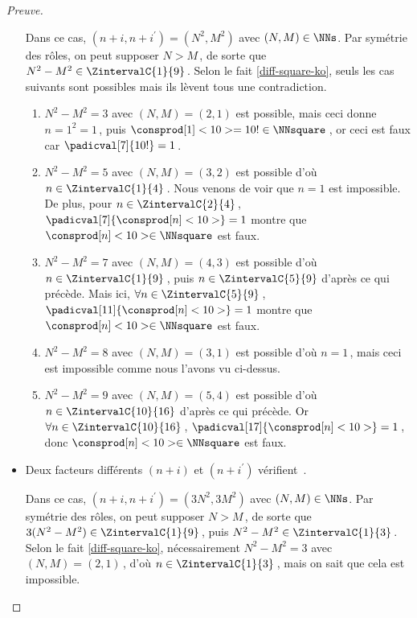 \begin{proof}[Preuve]
\begin{itemize}
		\smallskip
		\noindent
		Dans ce cas, $(n+i, n+i^\prime) = (N^2, M^2)$ avec $(N, M) \in \NNs$.
		Par symétrie des rôles, on peut supposer $N > M$\,, de sorte que $N^2 - M^2 \in \ZintervalC{1}{9}$\,. 
		Selon le fait \ref{diff-square-ko}, seuls les cas suivants sont possibles mais ils lèvent tous une contradiction.
		\begin{enumerate}
			\item $N^2 - M^2 = 3$ avec $(N, M) = (2, 1)$ est possible, mais ceci donne $n = 1^2 = 1$\,, puis $\consprod[1]<10> = 10 ! \in \NNsquare$\,, or ceci est faux car $\padicval[7]{10!} = 1$\,.


			\item $N^2 - M^2 = 5$ avec $(N, M) = (3, 2)$ est possible
			d'où $n \in \ZintervalC{1}{4}$\,.
			Nous venons de voir que $n = 1$ est impossible.
			De plus, pour $n \in \ZintervalC{2}{4}$\,, $\padicval[7]{\consprod[n]<10>} = 1$ montre que $\consprod[n]<10> \in \NNsquare$ est faux.
			

			\item $N^2 - M^2 = 7$ avec $(N, M) = (4, 3)$ est possible
			d'où $n \in \ZintervalC{1}{9}$\,, puis $n \in \ZintervalC{5}{9}$ d'après ce qui précède.
			Mais ici, $\forall n \in \ZintervalC{5}{9}$\,, $\padicval[11]{\consprod[n]<10>} = 1$ montre que $\consprod[n]<10> \in \NNsquare$ est faux.


			\item $N^2 - M^2 = 8$ avec $(N, M) = (3, 1)$ est possible
			d'où $n = 1$\,, mais ceci est impossible comme nous l'avons vu ci-dessus.


			\item $N^2 - M^2 = 9$ avec $(N, M) = (5, 4)$ est possible
			d'où $n \in \ZintervalC{10}{16}$ d'après ce qui précède.
			Or $\forall n \in \ZintervalC{10}{16}$\,, $\padicval[17]{\consprod[n]<10>} = 1$\,, donc $\consprod[n]<10> \in \NNsquare$ est faux.
		\end{enumerate}


    	\medskip
		\item Deux facteurs différents $(n+i)$ et $(n+i^\prime)$ vérifient \,.
		
		\smallskip
		\noindent
		Dans ce cas, $(n+i, n+i^\prime) = (3 N^2, 3 M^2)$ avec $(N, M) \in \NNs$.
		Par symétrie des rôles, on peut supposer $N > M$\,, de sorte que $3(N^2 - M^2) \in \ZintervalC{1}{9}$\,, puis $N^2 - M^2 \in \ZintervalC{1}{3}$\,. 
		Selon le fait \ref{diff-square-ko}, nécessairement $N^2 - M^2 = 3$ avec $(N, M) = (2, 1)$\,, d'où $n \in \ZintervalC{1}{3}$\,, mais on sait que cela est impossible.



\end{itemize}
\end{proof}
